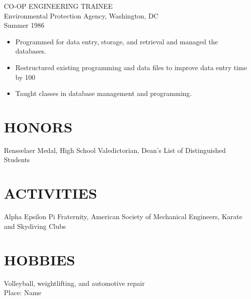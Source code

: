 \documentclass[11pt]{res} %
\begin{document}
\begin{resume}
CO-OP ENGINEERING TRAINEE \\
Environmental Protection Agency, Washington, DC \\ 
Summer 1986 
\vspace{0.2in}
 \begin{itemize} \itemsep -2pt
   \item Programmed for data entry, storage, and retrieval and managed 
    the databases. 
  \item  Restructured existing programming and data files  to  improve 
    data entry time by 100%
  \item Taught classes in database management and programming. 
\end{itemize} 

\section{HONORS} 
 
Rensselaer  Medal,  High  School  Valedictorian,  Dean's  List of 
Distinguished Students 
 
\section{ACTIVITIES} 
 
Alpha Epsilon  Pi  Fraternity,  American  Society  of  Mechanical 
Engineers, Karate and Skydiving Clubs 
 
\section{HOBBIES} 
 
Volleyball, weightlifting, and automotive repair 
\\

Place:
\hspace{12.00cm} 
Name
\end{resume}
\end{document}
